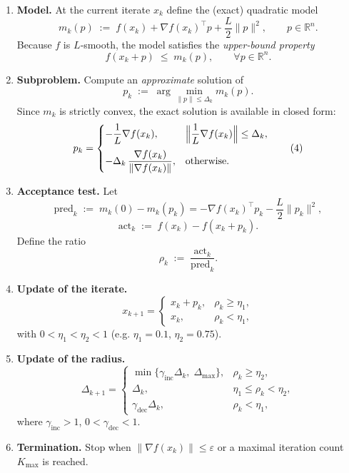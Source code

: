 \documentclass{article}
\begin{document}
\begin{enumerate}[label=\arabic*)]
\item \textbf{Model.}  At the current iterate $x_k$ define the (exact) quadratic model
\[
m_k(p)\;:=\; f(x_k)+\nabla f(x_k)^{\top}p+\frac{L}{2}\|p\|^{2},
\qquad p\in\mathbb{R}^{n}.
\tag{1}
\]
Because $f$ is $L$‑smooth, the model satisfies the \emph{upper‑bound property}
\[
f(x_k+p)\;\le\; m_k(p), \qquad\forall p\in\mathbb{R}^{n}.
\tag{2}
\]

\item \textbf{Subproblem.}  Compute an \emph{approximate} solution of
\[
p_k \;:=\; \arg\min_{\|p\|\le\Delta_k} m_k(p).
\tag{3}
\]
Since $m_k$ is strictly convex, the exact solution is available in closed form:
\[
p_k=
\begin{cases}
-\dfrac{1}{L}\nabla f(x_k), & \displaystyle\Bigl\|\dfrac{1}{L}\nabla f(x_k)\Bigr\|\le\Delta_k,\\[2ex]
-\displaystyle\Delta_k\,
\dfrac{\nabla f(x_k)}{\|\nabla f(x_k)\|}, & \text{otherwise}.
\end{cases}
\tag{4}
\]

\item \textbf{Acceptance test.}  Let
\[
\text{pred}_k\;:=\; m_k(0)-m_k(p_k)
= -\nabla f(x_k)^{\top}p_k-\frac{L}{2}\|p_k\|^{2},
\]
\[
\text{act}_k\;:=\; f(x_k)-f(x_k+p_k).
\]
Define the ratio
\[
\rho_k\;:=\;\frac{\text{act}_k}{\text{pred}_k}.
\tag{5}
\]

\item \textbf{Update of the iterate.}
\[
x_{k+1}= 
\begin{cases}
x_k+p_k, & \rho_k\ge\eta_{1},\\
x_k,    & \rho_k<\eta_{1},
\end{cases}
\tag{6}
\]
with $0<\eta_{1}<\eta_{2}<1$ (e.g. $\eta_{1}=0.1$, $\eta_{2}=0.75$).

\item \textbf{Update of the radius.}
\[
\Delta_{k+1}= 
\begin{cases}
\min\{\gamma_{\text{inc}}\Delta_k,\;\Delta_{\max}\}, & \rho_k\ge\eta_{2},\\[1ex]
\Delta_k,                                         & \eta_{1}\le\rho_k<\eta_{2},\\[1ex]
\gamma_{\text{dec}}\Delta_k,                      & \rho_k<\eta_{1},
\end{cases}
\tag{7}
\]
where $\gamma_{\text{inc}}>1$, $0<\gamma_{\text{dec}}<1$.

\item \textbf{Termination.}  Stop when $\|\nabla f(x_k)\|\le\varepsilon$ or a maximal
iteration count $K_{\max}$ is reached.
\end{enumerate}
\end{document}
